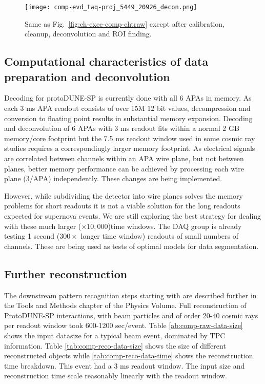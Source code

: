 
\begin{figure}[t]
  \texttt{[image: comp-evd\_twq-proj\_5449\_20926\_decon.png]}
\caption{
Same as Fig.~\ref{fig:ch-exec-comp-chtraw} except after calibration, cleanup, deconvolution and ROI finding. 
}
\label{fig:ch-exec-comp-chtroi}
\end{figure}


\subsection{Computational characteristics of data preparation and deconvolution }
Decoding for protoDUNE-SP is currently done with all 6 APAs in memory. As each 3 ms APA readout consists of over 15M 12 bit values, decompression and conversion to floating point results in substantial memory expansion.  Decoding and deconvolution of 6 APAs with 3 ms readout fits within a normal 2 GB memory/core footprint but the 7.5 ms readout window used in some cosmic ray studies requires a correspondingly larger memory footprint. As electrical signals are correlated between channels within an APA wire plane, but not between planes, better memory performance can be achieved by processing each wire plane (3/APA) independently. These changes are being implemented.


However,  while subdividing the detector into wire planes solves the memory problems for short readouts it is  not a viable solution for the long readouts expected for supernova events. We are still exploring the best strategy for dealing with these much larger ($\times 10,000$)time windows. The DAQ group is already testing 1 second ($300 \times$ longer time window) readouts of small numbers of channels.  These are being used as tests of optimal models for data segmentation. 

\subsection{Further reconstruction}
The downstream pattern recognition steps starting with  are described further in the Tools and Methods chapter of the Physics Volume.  
Full reconstruction of ProtoDUNE-SP interactions, with beam particles and of order 20-40 cosmic rays per readout window took 600-1200 sec/event.
Table  \ref{ab:comp-raw-data-size} shows the input datasize for a typical beam event, dominated by TPC information. Table  \ref{tab:comp-reco-data-size} shows the size of different reconstructed objects while \ref{tab:comp-reco-data-time} shows the reconstruction time breakdown.  This event had a 3 ms readout window.  The input size and reconstruction time scale reasonably linearly with the readout window.  


